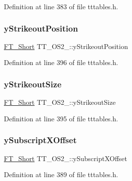 Definition at line 383 of file tttables.\+h.

\mbox{\label{struct_t_t___o_s2___ab5c15642248db1ca5c40c96b684c82d0}} 
\subsubsection{\texorpdfstring{yStrikeoutPosition}{yStrikeoutPosition}}
{\footnotesize\ttfamily \mbox{\hyperlink{fttypes_8h_aa7279be89046a2563cd3d4d6651fbdcf}{F\+T\+\_\+\+Short}} T\+T\+\_\+\+O\+S2\+\_\+\+::y\+Strikeout\+Position}



Definition at line 396 of file tttables.\+h.

\mbox{\label{struct_t_t___o_s2___a372e2b573bf86bc9ffb7a1a80c826455}} 
\subsubsection{\texorpdfstring{yStrikeoutSize}{yStrikeoutSize}}
{\footnotesize\ttfamily \mbox{\hyperlink{fttypes_8h_aa7279be89046a2563cd3d4d6651fbdcf}{F\+T\+\_\+\+Short}} T\+T\+\_\+\+O\+S2\+\_\+\+::y\+Strikeout\+Size}



Definition at line 395 of file tttables.\+h.

\mbox{\label{struct_t_t___o_s2___ab471c53b6e8a1c1f81cc410959bb5851}} 
\subsubsection{\texorpdfstring{ySubscriptXOffset}{ySubscriptXOffset}}
{\footnotesize\ttfamily \mbox{\hyperlink{fttypes_8h_aa7279be89046a2563cd3d4d6651fbdcf}{F\+T\+\_\+\+Short}} T\+T\+\_\+\+O\+S2\+\_\+\+::y\+Subscript\+X\+Offset}



Definition at line 389 of file tttables.\+h.

\mbox{\label{struct_t_t___o_s2___a3ae8d803a5055564e9f8a3926200e39c}} 
